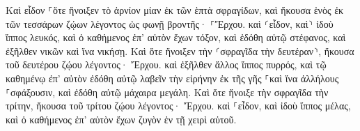 \documentclass{openreader}
\begin{document}
Καὶ εἶδον ⸀ὅτε ἤνοιξεν τὸ ἀρνίον μίαν ἐκ τῶν ἑπτὰ σφραγίδων, καὶ ἤκουσα ἑνὸς ἐκ τῶν τεσσάρων ζῴων λέγοντος ὡς φωνῇ βροντῆς· ⸀Ἔρχου. 
καὶ ⸂εἶδον, καὶ⸃ ἰδοὺ ἵππος λευκός, καὶ ὁ καθήμενος ἐπ’ αὐτὸν ἔχων τόξον, καὶ ἐδόθη αὐτῷ στέφανος, καὶ ἐξῆλθεν νικῶν καὶ ἵνα νικήσῃ. 
Καὶ ὅτε ἤνοιξεν τὴν ⸂σφραγῖδα τὴν δευτέραν⸃, ἤκουσα τοῦ δευτέρου ζῴου λέγοντος· Ἔρχου. 
καὶ ἐξῆλθεν ἄλλος ἵππος πυρρός, καὶ τῷ καθημένῳ ἐπ’ αὐτὸν ἐδόθη αὐτῷ λαβεῖν τὴν εἰρήνην ἐκ τῆς γῆς ⸀καὶ ἵνα ἀλλήλους ⸀σφάξουσιν, καὶ ἐδόθη αὐτῷ μάχαιρα μεγάλη. 
Καὶ ὅτε ἤνοιξε τὴν σφραγῖδα τὴν τρίτην, ἤκουσα τοῦ τρίτου ζῴου λέγοντος· Ἔρχου. καὶ ⸀εἶδον, καὶ ἰδοὺ ἵππος μέλας, καὶ ὁ καθήμενος ἐπ’ αὐτὸν ἔχων ζυγὸν ἐν τῇ χειρὶ αὐτοῦ. 
\end{document}
